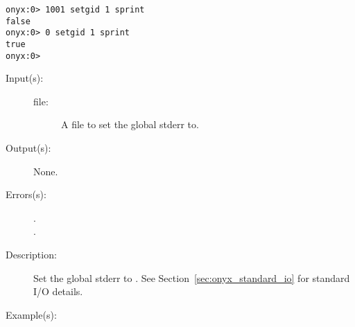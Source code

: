 \begin{description}
\begin{description}
\begin{verbatim}
onyx:0> 1001 setgid 1 sprint
false
onyx:0> 0 setgid 1 sprint
true
onyx:0>
		\end{verbatim}
	\end{description}
\label{systemdict:setgstderr}
\item[{\onyxop{file}{setgstderr}{--}}: ]
	\begin{description}\item[]
	\item[Input(s): ]
		\begin{description}\item[]
		\item[file: ]
			A file to set the global stderr to.
		\end{description}
	\item[Output(s): ] None.
	\item[Errors(s): ]
		\begin{description}\item[]
		\item[.]
		\item[.]
		\end{description}
	\item[Description: ]
		Set the global stderr to .  See
		Section~\ref{sec:onyx_standard_io} for standard I/O details.
	\item[Example(s): ]\begin{verbatim}


\end{verbatim}
\end{description}
\end{description}
